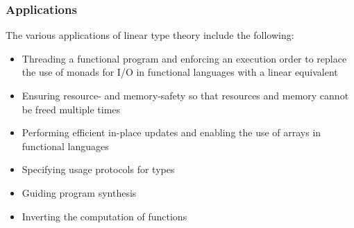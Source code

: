 \subsubsection{Applications}
The various applications of linear type theory include the following:
\begin{itemize}
	\item Threading a functional program and enforcing an execution order to replace the use of monads for I/O in functional languages with a linear equivalent \citep{de_vries_making_2009} \citep{bernardy_linear_2018} \citep{brady_idris_2021}
	\item Ensuring resource- and memory-safety so that resources and memory cannot be freed multiple times \citep{weiss_oxide_2021}
	\item Performing efficient in-place updates and enabling the use of arrays in functional languages \citep{de_vries_making_2009} \citep{bernardy_linear_2018}
	\item Specifying usage protocols for types \citep{brady_idris_2021}
	\item Guiding program synthesis \citep{brady_idris_2021}
	\item Inverting the computation of functions \citep{matsuda_sparcl_2020}
\end{itemize}
\clearpage
\newcommand{\acode}[1]{\textrm{\lstinline[language=aux]|#1|}}
\vspace*{\fill}
